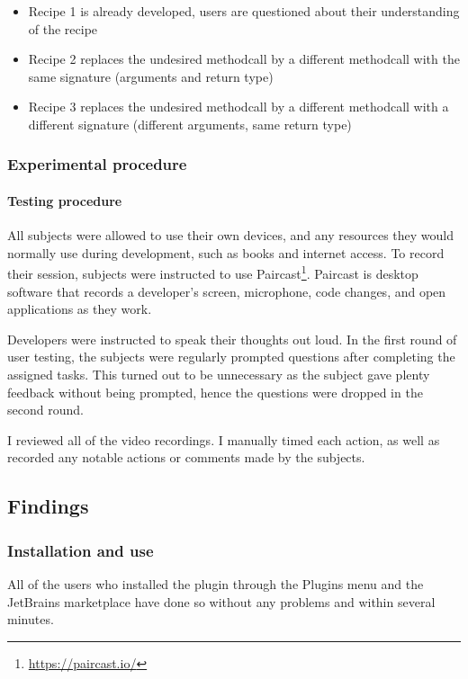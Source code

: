 \begin{itemize}[noitemsep]
    \item Recipe 1 is already developed, users are questioned about their understanding of the recipe
    \item Recipe 2 replaces the undesired methodcall by a different methodcall with the same signature (arguments and return type)
    \item Recipe 3 replaces the undesired methodcall by a different methodcall with a different signature (different arguments, same return type)
\end{itemize}

\subsubsection{Experimental procedure}
\paragraph{Testing procedure}
All subjects were allowed to use their own devices, and any resources they would normally use during development, such as books and internet access. To record their session, subjects were instructed to use Paircast\footnote{\url{https://paircast.io/}}.
Paircast is desktop software that records a developer's screen, microphone, code changes, and open applications as they work.

Developers were instructed to speak their thoughts out loud.
In the first round of user testing, the subjects were regularly prompted questions after completing the assigned tasks.
This turned out to be unnecessary as the subject gave plenty feedback without being prompted, hence the questions were dropped in the second round.

I reviewed all of the video recordings.
I manually timed each action, as well as recorded any notable actions or comments made by the subjects.

\subsection{Findings}
\subsubsection{Installation and use}
All of the users who installed the plugin through the Plugins menu and the JetBrains marketplace have done so without any problems and within several minutes.

